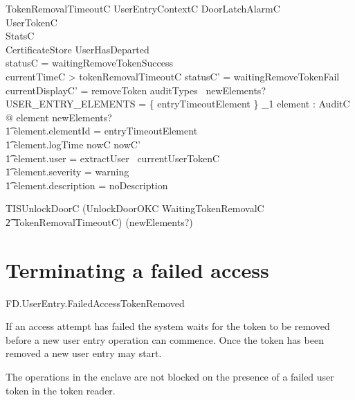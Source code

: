 \begin{schema}{TokenRemovalTimeoutC}
        UserEntryContextC
\also
        \Xi DoorLatchAlarmC
\\      \Xi UserTokenC
\\      \Xi StatsC       
\\      \Xi CertificateStore
\where
        \lnot UserHasDeparted
\\        statusC = waitingRemoveTokenSuccess
\\      currentTimeC > tokenRemovalTimeoutC 
\also
        statusC' = waitingRemoveTokenFail
\\      currentDisplayC' = removeToken
\also
        auditTypes~ newElements? \cap USER\_ENTRY\_ELEMENTS = 
        \{ entryTimeoutElement \} 
\also
        \exists_1 element : AuditC @ element \in newElements? 
\\ \t1  \land element.elementId = entryTimeoutElement
\\ \t1  \land element.logTime \in nowC \upto nowC'
\\ \t1  \land element.user = extractUser~ currentUserTokenC
\\ \t1  \land element.severity = warning
\\ \t1  \land element.description = noDescription
\end{schema}

\begin{zed}
        TISUnlockDoorC  (UnlockDoorOKC
        \lor  WaitingTokenRemovalC 
\\      \t2 \lor TokenRemovalTimeoutC) \hide (newElements?)
\end{zed}
 
\section{Terminating a failed access}

\begin{traceunit}{FD.UserEntry.FailedAccessTokenRemoved}
\end{traceunit}

If an access attempt has failed the system waits for the token to be
removed before a new user entry operation can commence. Once the token has been
removed a new user entry may start.

The operations in the enclave are not blocked on the presence of a
failed user token in the token reader. 


